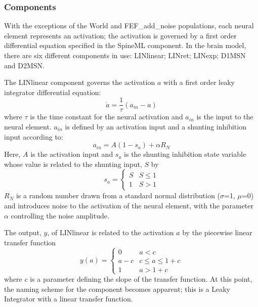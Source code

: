 \documentclass{frontiersSCNS}
\begin{document}
\subsubsection{Components}

With the exceptions of the World and FEF\_add\_noise populations, each
neural element represents an activation; the activation is governed by
a first order differential equation specified in the SpineML
component. In the brain model, there are six different components in
use: LINlinear; LINret; LINexp; D1MSN and D2MSN.

The LINlinear component governs the activation $a$ with a first order
leaky integrator differential equation:
\begin{equation}
   \dot{a} = \frac{1}{\tau}(a_{in}-a)
\end{equation}
where $\tau$ is the time constant for the neural activation and
$a_{in}$ is the input to the neural element. $a_{in}$ is defined by an
activation input and a shunting inhibition input according to:
\begin{equation}
   a_{in} = A(1-s_a)+\alpha R_N
\end{equation}
Here, $A$ is the activation input and $s_a$ is the shunting inhibition
state variable whose value is related to the shunting input, $S$ by
\begin{equation}
   s_a = \begin{cases}
      S & S\leq 1 \\
      1 & S > 1
   \end{cases}
\end{equation}
$R_N$ is a random number drawn from a standard normal distribution
($\sigma$=1, $\mu$=0) and introduces noise to the activation of the
neural element, with the parameter $\alpha$ controlling the noise
amplitude.

The output, $y$, of LINlinear is related to the activation $a$ by the
piecewise linear transfer function
\begin{equation}
   y(a) = \begin{cases}
      0   & a < c \\
      a-c & c \leq a \leq 1+c \\
      1   & a > 1+c
   \end{cases}
\end{equation}
where $c$ is a parameter defining the slope of the transfer
function. At this point, the naming scheme for the component becomes
apparent; this is a Leaky Integrator with a linear transfer function.
\end{document}
